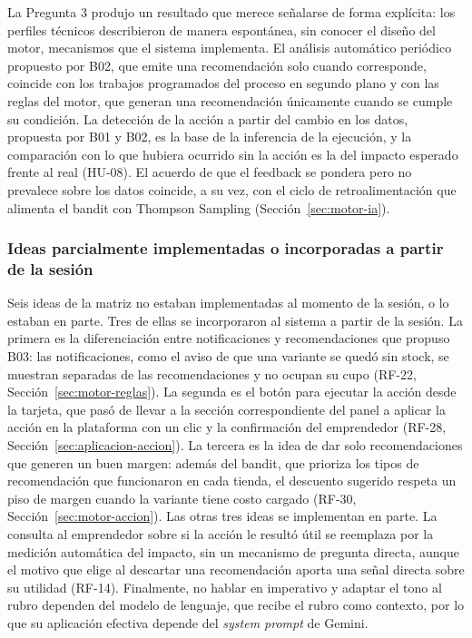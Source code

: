 La Pregunta 3 produjo un resultado que merece señalarse de forma explícita: los perfiles técnicos describieron de manera espontánea, sin conocer el diseño del motor, mecanismos que el sistema implementa. El análisis automático periódico propuesto por B02, que emite una recomendación solo cuando corresponde, coincide con los trabajos programados del proceso en segundo plano y con las reglas del motor, que generan una recomendación únicamente cuando se cumple su condición. La detección de la acción a partir del cambio en los datos, propuesta por B01 y B02, es la base de la inferencia de la ejecución, y la comparación con lo que hubiera ocurrido sin la acción es la del impacto esperado frente al real (HU-08). El acuerdo de que el feedback se pondera pero no prevalece sobre los datos coincide, a su vez, con el ciclo de retroalimentación que alimenta el bandit con Thompson Sampling (Sección~\ref{sec:motor-ia}).

\subsubsection{Ideas parcialmente implementadas o incorporadas a partir de la sesión}

Seis ideas de la matriz no estaban implementadas al momento de la sesión, o lo estaban en parte. Tres de ellas se incorporaron al sistema a partir de la sesión. La primera es la diferenciación entre notificaciones y recomendaciones que propuso B03: las notificaciones, como el aviso de que una variante se quedó sin stock, se muestran separadas de las recomendaciones y no ocupan su cupo (RF-22, Sección~\ref{sec:motor-reglas}). La segunda es el botón para ejecutar la acción desde la tarjeta, que pasó de llevar a la sección correspondiente del panel a aplicar la acción en la plataforma con un clic y la confirmación del emprendedor (RF-28, Sección~\ref{sec:aplicacion-accion}). La tercera es la idea de dar solo recomendaciones que generen un buen margen: además del bandit, que prioriza los tipos de recomendación que funcionaron en cada tienda, el descuento sugerido respeta un piso de margen cuando la variante tiene costo cargado (RF-30, Sección~\ref{sec:motor-accion}). Las otras tres ideas se implementan en parte. La consulta al emprendedor sobre si la acción le resultó útil se reemplaza por la medición automática del impacto, sin un mecanismo de pregunta directa, aunque el motivo que elige al descartar una recomendación aporta una señal directa sobre su utilidad (RF-14). Finalmente, no hablar en imperativo y adaptar el tono al rubro dependen del modelo de lenguaje, que recibe el rubro como contexto, por lo que su aplicación efectiva depende del \emph{system prompt} de Gemini.

